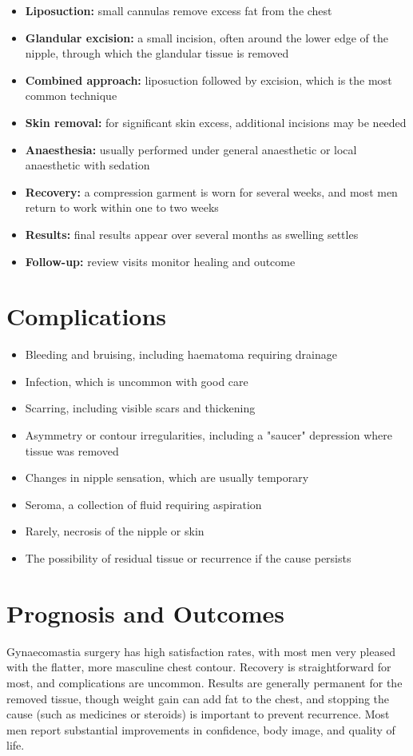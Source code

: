 \begin{itemize}
    \item \textbf{Liposuction:} small cannulas remove excess fat from the chest
    \item \textbf{Glandular excision:} a small incision, often around the lower edge of the nipple, through which the glandular tissue is removed
    \item \textbf{Combined approach:} liposuction followed by excision, which is the most common technique
    \item \textbf{Skin removal:} for significant skin excess, additional incisions may be needed
    \item \textbf{Anaesthesia:} usually performed under general anaesthetic or local anaesthetic with sedation
    \item \textbf{Recovery:} a compression garment is worn for several weeks, and most men return to work within one to two weeks
    \item \textbf{Results:} final results appear over several months as swelling settles
    \item \textbf{Follow-up:} review visits monitor healing and outcome
\end{itemize}

\section*{Complications}
\begin{itemize}
    \item Bleeding and bruising, including haematoma requiring drainage
    \item Infection, which is uncommon with good care
    \item Scarring, including visible scars and thickening
    \item Asymmetry or contour irregularities, including a "saucer" depression where tissue was removed
    \item Changes in nipple sensation, which are usually temporary
    \item Seroma, a collection of fluid requiring aspiration
    \item Rarely, necrosis of the nipple or skin
    \item The possibility of residual tissue or recurrence if the cause persists
\end{itemize}

\section*{Prognosis and Outcomes}
Gynaecomastia surgery has high satisfaction rates, with most men very pleased with the flatter, more masculine chest contour. Recovery is straightforward for most, and complications are uncommon. Results are generally permanent for the removed tissue, though weight gain can add fat to the chest, and stopping the cause (such as medicines or steroids) is important to prevent recurrence. Most men report substantial improvements in confidence, body image, and quality of life.


